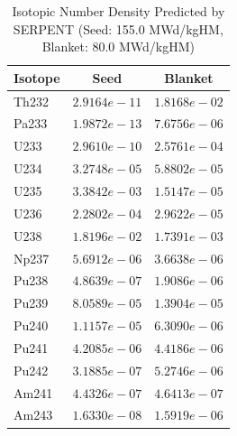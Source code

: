 \begin{table}[htbp]
\centering
\caption{Isotopic Number Density Predicted by SERPENT (Seed: 155.0 MWd/kgHM, Blanket: 80.0 MWd/kgHM)}
\label{tab:adens_comparison}
\begin{tabular}{lcc}
\hline\hline
Isotope & Seed & Blanket \\
\hline
Th232 & $2.9164e-11$ & $1.8168e-02$ \\
Pa233 & $1.9872e-13$ & $7.6756e-06$ \\
U233 & $2.9610e-10$ & $2.5761e-04$ \\
U234 & $3.2748e-05$ & $5.8802e-05$ \\
U235 & $3.3842e-03$ & $1.5147e-05$ \\
U236 & $2.2802e-04$ & $2.9622e-05$ \\
U238 & $1.8196e-02$ & $1.7391e-03$ \\
Np237 & $5.6912e-06$ & $3.6638e-06$ \\
Pu238 & $4.8639e-07$ & $1.9086e-06$ \\
Pu239 & $8.0589e-05$ & $1.3904e-05$ \\
Pu240 & $1.1157e-05$ & $6.3090e-06$ \\
Pu241 & $4.2085e-06$ & $4.4186e-06$ \\
Pu242 & $3.1885e-07$ & $5.2746e-06$ \\
Am241 & $4.4326e-07$ & $4.6413e-07$ \\
Am243 & $1.6330e-08$ & $1.5919e-06$ \\
\hline
\end{tabular}
\end{table}